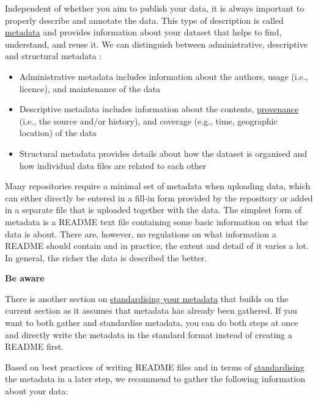 \documentclass[
  oneside]{book}
\begin{document}
Independent of whether you aim to publish your data, it is always important to properly describe and annotate the data. This type of description is called \hyperref[metadata]{metadata} and provides information about your dataset that helps to find, understand, and reuse it. We can distinguish between administrative, descriptive and structural metadata \autocite{Riley_2017}:

\begin{itemize}
\item
  Administrative metadata includes information about the authors, usage (i.e., licence), and maintenance of the data
\item
  Descriptive metadata includes information about the contents, \hyperref[provenance]{provenance} (i.e., the source and/or history), and coverage (e.g., time, geographic location) of the data
\item
  Structural metadata provides details about how the dataset is organised and how individual data files are related to each other
\end{itemize}

Many repositories require a minimal set of metadata when uploading data, which can either directly be entered in a fill-in form provided by the repository or added in a separate file that is uploaded together with the data. The simplest form of metadata is a README text file containing some basic information on what the data is about. There are, however, no regulations on what information a README should contain and in practice, the extent and detail of it varies a lot. In general, the richer the data is described the better.

\begin{disclaimerbox}

{\textbf{Be aware}}

There is another section on \hyperref[standardise-and-structure-your-metadata]{standardising your metadata} that builds on the current section as it assumes that metadata has already been gathered. If you want to both gather and standardise metadata, you can do both steps at once and directly write the metadata in the standard format instead of creating a README first.

\end{disclaimerbox}

Based on best practices of writing README files and in terms of \hyperref[standardise]{standardising} the metadata in a later step, we recommend to gather the following information about your data:
\end{document}
